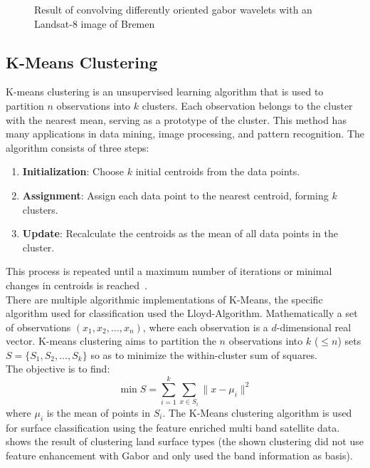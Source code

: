 \documentclass[12pt,a4paper, english,twoside]{article}
\begin{document}
\begin{figure}[!htbp]
\begin{subfigure}[b]{0.45\textwidth}
         \label{fig:feat06}
     \end{subfigure}
        \caption{Result of convolving differently oriented gabor wavelets with an Landsat-8 image of Bremen}\label{fig:gaborExample}
    \end{figure}

%
\newpage
  \subsection{K-Means Clustering}\label{sec:kmeans}
    K-means clustering is an unsupervised learning algorithm that is used to partition $n$ observations into $k$ clusters. 
    Each observation belongs to the cluster with the nearest mean, serving as a prototype of the cluster. 
    This method has many applications in data mining, image processing, and pattern recognition.
    The algorithm consists of three steps:
    \begin{enumerate}
        \item \textbf{Initialization}: Choose $k$ initial centroids from the data points.
        \item \textbf{Assignment}: Assign each data point to the nearest centroid, forming $k$ clusters.
        \item \textbf{Update}: Recalculate the centroids as the mean of all data points in the cluster. 
    \end{enumerate}
    This process is repeated until a maximum number of iterations or minimal changes in centroids is reached~\autocite{Sinaga2020}.\\ 
    There are multiple algorithmic implementations of K-Means, the specific algorithm used for classification used the Lloyd-Algorithm.
    Mathematically a set of observations $(x_1, x_2, \ldots, x_n)$, where each observation is a $d$-dimensional real vector.
    K-means clustering aims to partition the $n$ observations into $k$ ($\leq n$) sets $S = \{S_1, S_2, \ldots, S_k\}$ so as to minimize the within-cluster sum of squares. \\
    The objective is to find:
    \begin{equation}
        \min{S} = \sum_{i=1}^{k} \sum_{x \in S_i} \| x - \mu_i \|^2
    \end{equation}
    where $\mu_i$ is the mean of points in $S_i$.
    The K-Means clustering algorithm is used for surface classification using the feature enriched multi band satellite data.
     shows the result of clustering land surface types (the shown clustering did not use feature enhancement with Gabor and only used the band information as basis).%
\end{document}

